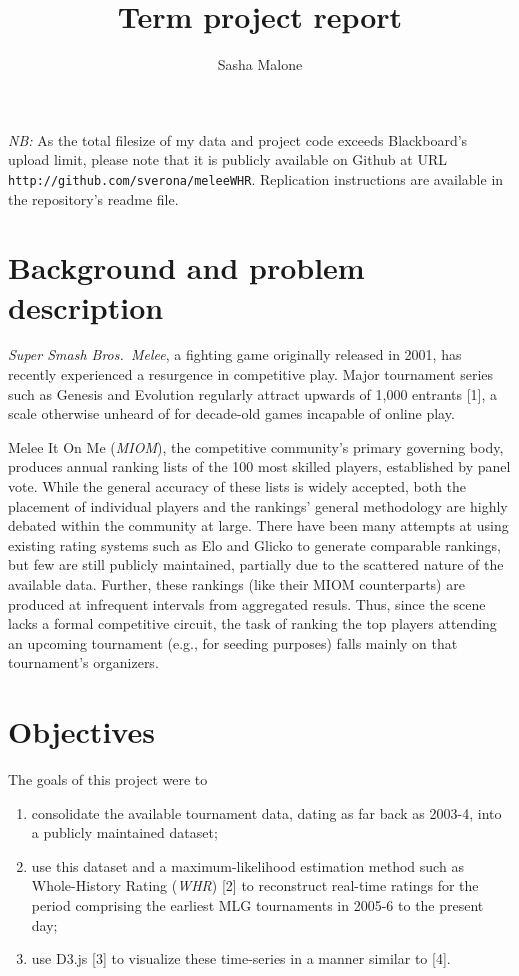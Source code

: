 \documentclass[10pt]{article}
\title{Term project report}
\author{Sasha Malone}
\theoremstyle{definition}
\theoremstyle{remark}
\providecommand{\tightlist}{%
      \setlength{\itemsep}{0pt}\setlength{\parskip}{0pt}}
\begin{document}
\emph{NB:} As the total filesize of my data and project code exceeds
Blackboard's upload limit, please note that it is publicly available on Github
at URL \texttt{http://github.com/sverona/meleeWHR}. Replication instructions
are available in the repository's readme file.

\hypertarget{background-and-problem-description}{%
\section{Background and problem description}\label{background-and-problem-description}}

\emph{Super Smash Bros.~Melee}, a fighting game
originally released in 2001, has recently experienced a resurgence in
competitive play. Major tournament series such as Genesis and Evolution
regularly attract upwards of 1,000 entrants {[}1{]}, a scale otherwise
unheard of for decade-old games incapable of online play.

Melee It On Me (\emph{MIOM}), the competitive community's primary
governing body, produces annual ranking lists of the 100 most skilled
players, established by panel vote. While the general accuracy of these
lists is widely accepted, both the placement of individual players and
the rankings' general methodology are highly debated within the community
at large. There have been many attempts at using existing rating systems such
as Elo and Glicko to generate comparable rankings, but few are still
publicly maintained, partially due to the scattered nature of the
available data. Further, these rankings (like their MIOM counterparts)
are produced at infrequent intervals from aggregated resuls. Thus, since
the scene lacks a formal competitive circuit, the task of ranking the
top players attending an upcoming tournament (e.g., for seeding
purposes) falls mainly on that tournament's organizers.

\hypertarget{objectives}{%
\section{Objectives}\label{objectives}}

The goals of this project were to

\begin{enumerate}
\def\labelenumi{\roman{enumi}.}
\tightlist
\item
  consolidate the available tournament data, dating as far back as
  2003-4, into a publicly maintained dataset;
\item
  use this dataset and a maximum-likelihood estimation method such as
  Whole-History Rating (\emph{WHR}) {[}2{]} to reconstruct real-time
  ratings for the period comprising the earliest MLG tournaments in
  2005-6 to the present day;
\item
  use D3.js {[}3{]} to visualize these time-series in a manner similar
  to {[}4{]}.
\end{enumerate}
\end{document}
